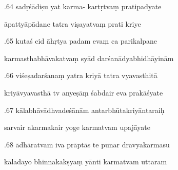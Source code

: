 \documentclass[article,12pt,a4paper]{memoir}%
\newcounter{parCount}
\begin{document}
	  
	  \pstart {}.64 sadṛśādiṣu yat karma- kartṛtvaṃ pratipadyate 
	{}
	\pend%
      

	  
	  \pstart \leavevmode%
	āpattyāpādane tatra viṣayatvaṃ prati kriye 
	{}
	\pend%
      

	  
	  \pstart {}.65 kutaś cid āhṛtya padam evaṃ ca parikalpane 
	{}
	\pend%
      

	  
	  \pstart \leavevmode%
	karmasthabhāvakatvaṃ syād darśanādyabhidhāyinām 
	{}
	\pend%
      

	  
	  \pstart {}.66 viśeṣadarśanaṃ yatra kriyā tatra vyavasthitā 
	{}
	\pend%
      

	  
	  \pstart \leavevmode%
	kriyāvyavasthā tv anyeṣāṃ śabdair eva prakāśyate 
	{}
	\pend%
      

	  
	  \pstart {}.67 kālabhāvādhvadeśānām   antarbhūtakriyāntaraiḥ 
	{}
	\pend%
      

	  
	  \pstart \leavevmode%
	sarvair akarmakair yoge karmatvam upajāyate 
	{}
	\pend%
      

	  
	  \pstart {}.68 ādhāratvam iva prāptās te punar dravyakarmasu 
	{}
	\pend%
      

	  
	  \pstart \leavevmode%
	kālādayo bhinnakakṣyaṃ yānti karmatvam uttaram 
	{}
	\pend%
      
\end{document}
